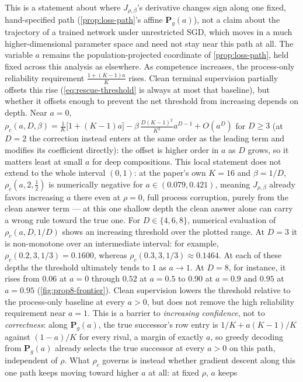 This is a statement about where $J_{\rho,\beta}$'s derivative changes sign
along one fixed, hand-specified path (\cref{prop:loss-path}'s affine
$\bm{P}_g(a)$), not a claim about the trajectory of a trained network under
unrestricted SGD, which moves in a much higher-dimensional parameter space
and need not stay near this path at all.
The variable $a$ remains the population-projected coordinate of \cref{prop:loss-path},
held fixed across this analysis as elsewhere. As competence increases, the
process-only reliability requirement $\frac{1+(K-1)a}{K}$ rises. Clean
terminal supervision partially offsets this rise (\cref{eq:rescue-threshold}
is always at most that baseline), but whether it offsets enough to prevent
the net threshold from increasing depends on depth. Near $a=0$,
$\rho_c(a,D,\beta)=\frac1K\bigl[1+(K-1)a\bigr]-\beta\,\frac{D(K-1)^2}{K^2}a^{D-1}+O(a^D)$
for $D\ge3$ (at $D=2$ the correction instead enters at the same order as
the leading term and modifies its coefficient directly): the offset is
higher order in $a$ as $D$ grows, so it matters least at small $a$ for
deep compositions. This local statement does not extend to the whole
interval $(0,1)$: at the paper's own $K=16$ and $\beta=1/D$,
$\rho_c(a,2,\tfrac12)$ is numerically negative for $a\in(0.079,0.421)$,
meaning $J_{\rho,\beta}$ already favors increasing $a$ there even at
$\rho=0$, full process corruption, purely from the clean answer term ---
at this one shallow depth the clean answer alone can carry a wrong rule
toward the true one. For $D\in\{4,6,8\}$, numerical evaluation of
$\rho_c(a,D,1/D)$ shows an increasing threshold over the plotted range.
At $D=3$ it is non-monotone over an intermediate interval: for example,
$\rho_c(0.2,3,1/3)=0.1600$, whereas
$\rho_c(0.3,3,1/3)\approx0.1464$. At each of these depths the threshold
ultimately tends to $1$ as $a\to1$. At $D=8$, for instance, it rises from
$0.06$ at $a=0$ through $0.52$ at $a=0.5$ to $0.90$ at $a=0.9$ and
$0.95$ at $a=0.95$ (\cref{fig:prop8-frontier}). Clean supervision lowers
the threshold relative to the process-only baseline at every $a>0$,
but does not remove the high reliability requirement near $a=1$. This is a barrier to \emph{increasing confidence},
not to \emph{correctness}: along $\bm{P}_g(a)$, the true successor's row
entry is $1/K+a(K-1)/K$ against $(1-a)/K$ for every rival, a margin of
exactly $a$, so greedy decoding from $\bm{P}_g(a)$ already selects the true
successor at every $a>0$ on this path, independent of $\rho$. What
$\rho_c$ governs is instead whether gradient descent along this one path
keeps moving toward higher $a$ at all: at fixed $\rho$, $a$ keeps
